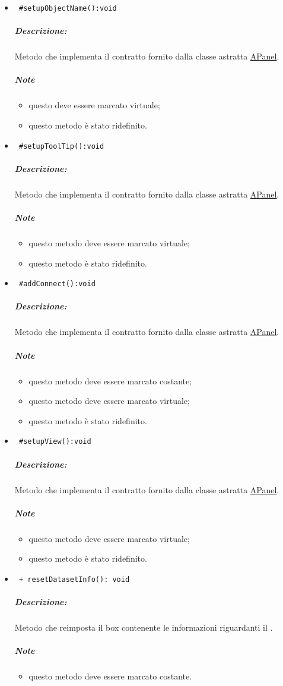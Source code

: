 \begin{itemize}
\item\color{blue}\verb! #setupObjectName():void!
\color{black}
\subparagraph{Descrizione: }Metodo che implementa il contratto fornito dalla classe astratta \hyperref[speAPanel]{APanel}.
 \subparagraph{Note}
 \begin{itemize}
  \item questo deve essere marcato virtuale;
 \item questo metodo è stato ridefinito.
 \end{itemize}
 
\item\color{blue}\verb! #setupToolTip():void!
\color{black}
\subparagraph{Descrizione: }Metodo che implementa il contratto fornito dalla classe astratta \hyperref[speAPanel]{APanel}.
 \subparagraph{Note}
 \begin{itemize}
 \item questo metodo deve essere marcato virtuale;
 \item questo metodo è stato ridefinito.
 \end{itemize}
 
\item\color{blue}\verb! #addConnect():void!
\color{black}
\subparagraph{Descrizione: }Metodo che implementa il contratto fornito dalla classe astratta \hyperref[speAPanel]{APanel}.
 \subparagraph{Note}
 \begin{itemize}
 \item questo metodo deve essere marcato costante;
 \item questo metodo deve essere marcato virtuale;
 \item questo metodo è stato ridefinito.
 \end{itemize}
 
\item\color{blue}\verb! #setupView():void!
\color{black}
\subparagraph{Descrizione: }Metodo che implementa il contratto fornito dalla classe astratta \hyperref[speAPanel]{APanel}.
 \subparagraph{Note}
 \begin{itemize}
 \item questo metodo deve essere marcato virtuale;
 \item questo metodo è stato ridefinito.
 \end{itemize}

\item\color{blue}\verb! + resetDatasetInfo(): void!
\color{black}
\subparagraph{Descrizione:}Metodo che reimposta il box contenente le informazioni riguardanti il \dataset{}.
 \subparagraph{Note}
 \begin{itemize}
 \item questo metodo deve essere marcato costante.
 \end{itemize}


\end{itemize}
